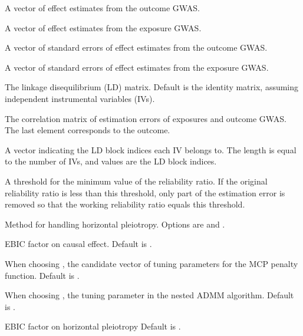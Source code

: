 \documentclass[a4paper]{book}
\begin{document}
\begin{Arguments}
\begin{ldescription}
\item[\code{by}] A vector of effect estimates from the outcome GWAS.

\item[\code{bX}] A vector of effect estimates from the exposure GWAS.

\item[\code{byse}] A vector of standard errors of effect estimates from the outcome GWAS.

\item[\code{bXse}] A vector of standard errors of effect estimates from the exposure GWAS.

\item[\code{LD}] The linkage disequilibrium (LD) matrix. Default is the identity matrix, assuming independent instrumental variables (IVs).

\item[\code{Rxy}] The correlation matrix of estimation errors of exposures and outcome GWAS. The last element corresponds to the outcome.

\item[\code{cluster.index}] A vector indicating the LD block indices each IV belongs to. The length is equal to the number of IVs, and values are the LD block indices.

\item[\code{reliability.thres}] A threshold for the minimum value of the reliability ratio. If the original reliability ratio is less than this threshold, only part of the estimation error is removed so that the working reliability ratio equals this threshold.

\item[\code{Method}] Method for handling horizontal pleiotropy. Options are  and .

\item[\code{ebic.theta}] EBIC factor on causal effect. Default is .

\item[\code{tauvec}] When choosing , the candidate vector of tuning parameters for the MCP penalty function. Default is .

\item[\code{rho}] When choosing , the tuning parameter in the nested ADMM algorithm. Default is .

\item[\code{ebic.gamma}] EBIC factor on horizontal pleiotropy Default is .


\end{ldescription}
\end{Arguments}
\end{document}
